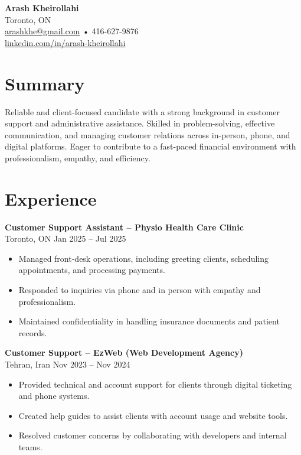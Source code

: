 \documentclass[letterpaper,10pt]{article}
\begin{document}

{\LARGE \textbf{Arash Kheirollahi}}\\[0.2em]
Toronto, ON \\
\href{mailto:arashkhe@gmail.com}{arashkhe@gmail.com} • 416-627-9876 \\
\href{https://linkedin.com/in/arash-kheirollahi}{linkedin.com/in/arash-kheirollahi} 

\vspace{0.8em}

\section*{Summary}
Reliable and client-focused candidate with a strong background in customer support and administrative assistance. Skilled in problem-solving, effective communication, and managing customer relations across in-person, phone, and digital platforms. Eager to contribute to a fast-paced financial environment with professionalism, empathy, and efficiency.

\section*{Experience}
\textbf{Customer Support Assistant – Physio Health Care Clinic}\\
Toronto, ON \hfill Jan 2025 -- Jul 2025
\begin{itemize}[leftmargin=*]
  \item Managed front-desk operations, including greeting clients, scheduling appointments, and processing payments.
  \item Responded to inquiries via phone and in person with empathy and professionalism.
  \item Maintained confidentiality in handling insurance documents and patient records.
\end{itemize}

\textbf{Customer Support – EzWeb (Web Development Agency)}\\
Tehran, Iran \hfill Nov 2023 -- Nov 2024
\begin{itemize}[leftmargin=*]
  \item Provided technical and account support for clients through digital ticketing and phone systems.
  \item Created help guides to assist clients with account usage and website tools.
  \item Resolved customer concerns by collaborating with developers and internal teams.
\end{itemize}
\end{document}
